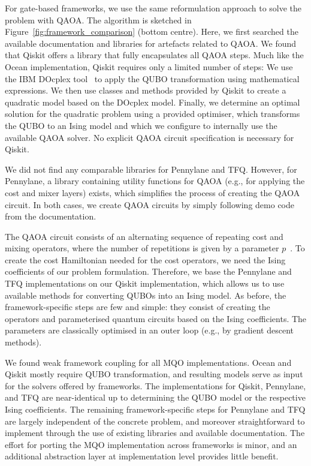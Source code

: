 \documentclass[conference]{IEEEtran}
\begin{document}
For gate-based frameworks, we use the same reformulation approach to solve the problem with QAOA. The algorithm is sketched in Figure~\ref{fig:framework_comparison} (bottom centre). Here, we first searched the available documentation and libraries for artefacts related to QAOA. We found that Qiskit offers a library that fully encapsulates all QAOA steps. Much like the Ocean implementation, Qiskit requires only a limited number of steps: We use the IBM DOcplex tool~\cite{docplex} to apply the QUBO transformation using mathematical expressions. We then use classes and methods provided by Qiskit to create a quadratic model based on the DOcplex model. Finally, we determine an optimal solution for the quadratic problem using a provided optimiser, which transforms the QUBO to an Ising model and which we configure to internally use the available QAOA solver. No explicit QAOA circuit specification is necessary for Qiskit.

We did not find any comparable libraries for Pennylane and TFQ. However, for Pennylane, a library containing utility functions for QAOA (e.g., for applying the cost and mixer layers) exists, which simplifies the process of creating the QAOA circuit. In both cases, we create QAOA circuits by simply following demo code from the documentation. 

The QAOA circuit consists of an alternating sequence of repeating cost and mixing operators, where the number of repetitions is given by a parameter $p$~\cite{Farhi.2014}. To create the cost Hamiltonian needed for the cost operators, we need the Ising coefficients of our problem formulation. Therefore, we base the Pennylane and TFQ implementations on our Qiskit implementation, which allows us to use available methods for converting QUBOs into an Ising model. As before, the framework-specific steps are few and simple: they consist of creating the operators and parameterised quantum circuits based on the Ising coefficients. The parameters are classically optimised in an outer loop (e.g., by gradient descent methods).

We found weak framework coupling for all MQO implementations. Ocean and Qiskit
mostly require QUBO transformation, and resulting models serve as input for the solvers offered by frameworks.
The implementations for Qiskit, Pennylane, and TFQ are near-identical up to determining the QUBO model
or the respective Ising coefficients. The remaining framework-specific steps for Pennylane and TFQ are largely independent
of the concrete problem, and moreover straightforward to implement through the use of existing libraries and available
documentation. The effort for porting the MQO implementation across frameworks
is minor, and an additional abstraction layer at implementation level provides little benefit.
\end{document}
